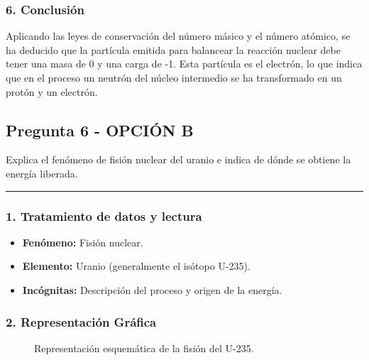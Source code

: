 \subsubsection*{6. Conclusión}
\begin{cajaconclusion}
Aplicando las leyes de conservación del número másico y el número atómico, se ha deducido que la partícula emitida para balancear la reacción nuclear debe tener una masa de 0 y una carga de -1. Esta partícula es el electrón, lo que indica que en el proceso un neutrón del núcleo intermedio se ha transformado en un protón y un electrón.
\end{cajaconclusion}

\newpage

\subsection{Pregunta 6 - OPCIÓN B}
\label{subsec:6B_2006_sep}

\begin{cajaenunciado}
Explica el fenómeno de fisión nuclear del uranio e indica de dónde se obtiene la energía liberada. 
\end{cajaenunciado}
\hrule

\subsubsection*{1. Tratamiento de datos y lectura}
\begin{itemize}
    \item \textbf{Fenómeno:} Fisión nuclear.
    \item \textbf{Elemento:} Uranio (generalmente el isótopo U-235).
    \item \textbf{Incógnitas:} Descripción del proceso y origen de la energía.
\end{itemize}

\subsubsection*{2. Representación Gráfica}
\begin{figure}[H]
    \centering
    \caption{Representación esquemática de la fisión del U-235.}
\end{figure}

